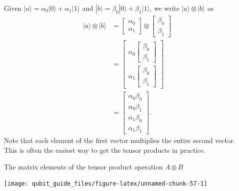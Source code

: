 \documentclass[fleqn,a4paper]{article}
\theoremstyle{definition}
\theoremstyle{definition}
\theoremstyle{definition}
\theoremstyle{definition}
\theoremstyle{remark}
\begin{document}
Given \(|a\rangle = \alpha_0|0\rangle + \alpha_1|1\rangle\) and \(|b\rangle = \beta_0|0\rangle +\beta_1|1\rangle\), we write \(|a\rangle\otimes|b\rangle\) as
\[
  \begin{aligned}
    |a\rangle\otimes|b\rangle
    &= \begin{bmatrix}\alpha_0\\\alpha_1\end{bmatrix} \otimes \begin{bmatrix}\beta_0\\\beta_1\end{bmatrix}
  \\&= \begin{bmatrix}\alpha_0\begin{bmatrix}\beta_0\\\beta_1\end{bmatrix}\\\alpha_1\begin{bmatrix}\beta_0\\\beta_1\end{bmatrix}\end{bmatrix}
  \\&= \begin{bmatrix}\alpha_0\beta_0\\\alpha_0\beta_1\\\alpha_1\beta_0\\\alpha_1\beta_1\end{bmatrix}.
  \end{aligned}
\]
Note that each element of the first vector multiplies the entire second vector.
This is often the easiest way to get the tensor products in practice.

The matrix elements of the tensor product operation \(A\otimes B\)

\begin{center}\texttt{[image: qubit\_guide\_files/figure-latex/unnamed-chunk-57-1]} \end{center}
\end{document}
